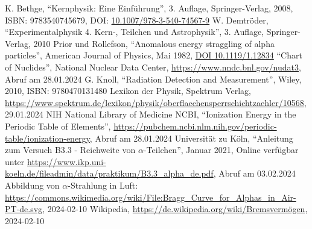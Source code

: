 \documentclass[12pt,a4paper]{scrartcl}
\numberwithin{equation}{section} %
\renewcommand{\[}{} %
\renewcommand{\]}{\noindent} %
\begin{document}
\clearpage

\begin{thebibliography}{99}
	K. Bethge, ``Kernphysik: Eine Einführung'', 3. Auflage,
	Springer-Verlag, 2008, ISBN: 9783540745679, DOI:
	\href{https://doi.org/10.1007/978-3-540-74567-9}{10.1007/978-3-540-74567-9}
	W. Demtröder, ``Experimentalphysik 4. Kern-, Teilchen und
	Astrophysik'', 3. Auflage, Springer-Verlag, 2010
	Prior und Rollefson, ``Anomalous energy straggling of alpha
	particles'', American Journal of Physics, Mai 1982,
	\href{https://doi.org/10.1119/1.12834}{DOI 10.1119/1.12834}
	``Chart of Nuclides'', National Nuclear Data Center,
	\url{https://www.nndc.bnl.gov/nudat3}, Abruf am 28.01.2024
	G. Knoll, ``Radiation Detection and Measurement'', Wiley, 2010, ISBN:
	9780470131480
\bibitem{Spektrum]}
	Lexikon der Physik, Spektrum Verlag,
	\url{https://www.spektrum.de/lexikon/physik/oberflaechensperrschichtzaehler/10568},
	29.01.2024
	NIH National Library of Medicine NCBI, ``Ionization Energy in the
	Periodic Table of Elements'',
	\url{https://pubchem.ncbi.nlm.nih.gov/periodic-table/ionization-energy},
	Abruf am 28.01.2024
	Universität zu Köln, ``Anleitung zum Versuch B3.3 - Reichweite von
	\(\alpha\)-Teilchen'', Januar 2021, Online verfügbar unter
	\url{https://www.ikp.uni-koeln.de/fileadmin/data/praktikum/B3.3_alpha_de.pdf},
	Abruf am 03.02.2024
	Abbildung von $\alpha$-Strahlung in Luft: \url{https://commons.wikimedia.org/wiki/File:Bragg_Curve_for_Alphas_in_Air-PT-de.svg}, 2024-02-10
	Wikipedia, \url{https://de.wikipedia.org/wiki/Bremsvermögen}, 2024-02-10
\end{thebibliography}
\end{document}
